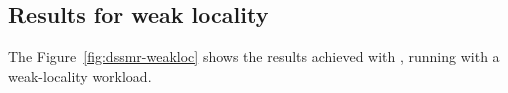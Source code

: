 \subsection{Results for weak locality} \label{sec:dssmr-evaluation:weakloc}

The Figure~\ref{fig:dssmr-weakloc} shows the results achieved with
\dssmrappname{}, running with a weak-locality workload.

